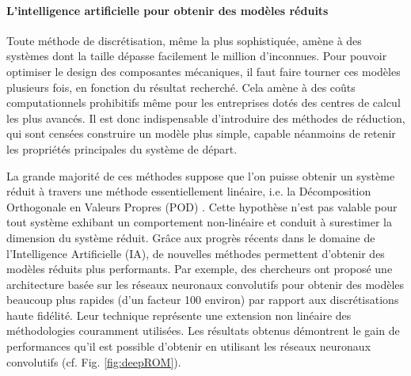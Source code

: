 \documentclass[12pt, french]{article}
\begin{document}
	\paragraph{\large L'intelligence artificielle pour obtenir des modèles réduits\\}
	Toute méthode de discrétisation, même la plus sophistiquée, amène à des systèmes dont la taille dépasse facilement le million d'inconnues. Pour pouvoir optimiser le design des composantes mécaniques, il faut faire tourner ces modèles plusieurs fois, en fonction du résultat recherché. Cela amène à des coûts computationnels prohibitifs même pour les entreprises dotés des centres de calcul les plus avancés. Il est donc indispensable d'introduire des méthodes de réduction, qui sont censées construire un modèle plus simple, capable néanmoins de retenir les propriétés principales du système de départ.
	\newline
	
	La grande majorité de ces méthodes suppose que l'on puisse obtenir un système réduit à travers une méthode essentiellement linéaire, i.e. la Décomposition Orthogonale en Valeurs Propres (POD) \cite{shinde2019,tello2020fluid}. Cette hypothèse n'est pas valable pour tout système exhibant un comportement non-linéaire et conduit à surestimer la dimension du système réduit. Grâce aux progrès récents dans le domaine de l'Intelligence Artificielle (IA), de nouvelles méthodes permettent d'obtenir des modèles réduits plus performants. Par exemple, des chercheurs ont proposé une architecture basée sur les réseaux neuronaux convolutifs \cite{lee2020} pour obtenir des modèles beaucoup plus rapides (d'un facteur 100 environ) par rapport aux discrétisations haute fidélité. Leur technique représente une extension non linéaire des méthodologies couramment utilisées. Les résultats obtenus démontrent le gain de performances qu'il est possible d'obtenir en utilisant les réseaux neuronaux convolutifs (cf. Fig. \ref{fig:deepROM}).
	
\end{document}

